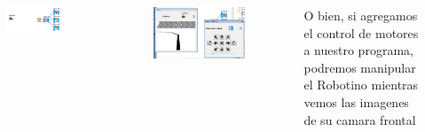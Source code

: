 \begin{frame}
	\begin{columns}
		\begin{figure}
			\begin{center}
				\includegraphics[width=0.95\textwidth]{images/01-vision-artificial/03.png}
			\end{center}
		\end{figure}
		\begin{figure}
			\begin{center}
				\includegraphics[width=0.95\textwidth]{images/01-vision-artificial/04.png}
			\end{center}
		\end{figure}

		O bien, si agregamos el control de motores a nuestro programa, podremos manipular el Robotino mientras vemos las imagenes de su camara frontal
	\end{columns}
\end{frame}

